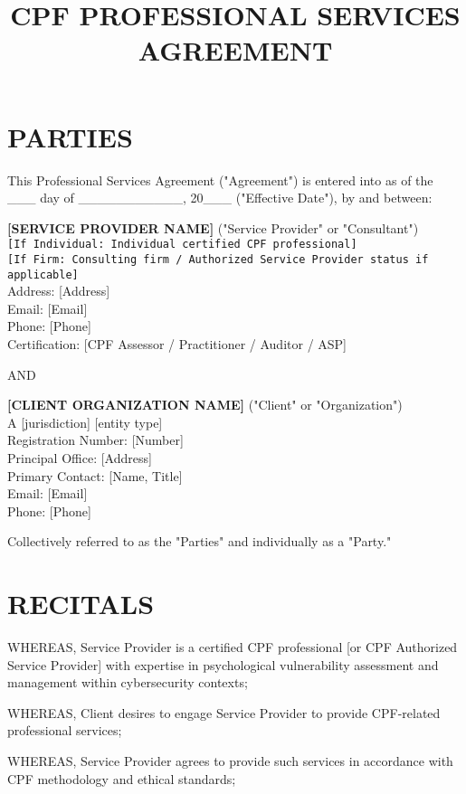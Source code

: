 \documentclass[11pt,a4paper]{article}
\title{\textbf{CPF PROFESSIONAL SERVICES\\AGREEMENT}}
\author{}
\date{}
\begin{document}
\maketitle

\section*{PARTIES}

This Professional Services Agreement ("Agreement") is entered into as of the \_\_\_ day of \_\_\_\_\_\_\_\_\_\_\_, 20\_\_\_ ("Effective Date"), by and between:

\textbf{[SERVICE PROVIDER NAME]} ("Service Provider" or "Consultant")\\
\texttt{[If Individual: Individual certified CPF professional]}\\
\texttt{[If Firm: Consulting firm / Authorized Service Provider status if applicable]}\\
Address: [Address]\\
Email: [Email]\\
Phone: [Phone]\\
Certification: [CPF Assessor / Practitioner / Auditor / ASP]

AND

\textbf{[CLIENT ORGANIZATION NAME]} ("Client" or "Organization")\\
A [jurisdiction] [entity type]\\
Registration Number: [Number]\\
Principal Office: [Address]\\
Primary Contact: [Name, Title]\\
Email: [Email]\\
Phone: [Phone]

Collectively referred to as the "Parties" and individually as a "Party."

\section*{RECITALS}

WHEREAS, Service Provider is a certified CPF professional [or CPF Authorized Service Provider] with expertise in psychological vulnerability assessment and management within cybersecurity contexts;

WHEREAS, Client desires to engage Service Provider to provide CPF-related professional services;

WHEREAS, Service Provider agrees to provide such services in accordance with CPF methodology and ethical standards;
\end{document}
